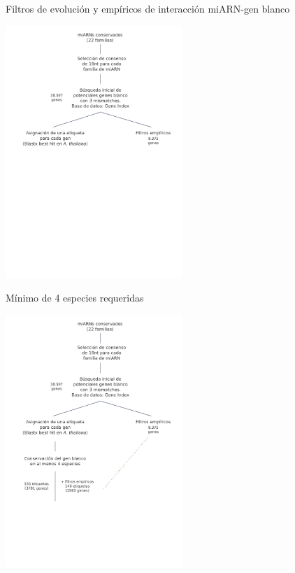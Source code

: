 \documentclass{beamer}
\begin{document}
\begin{frame}{Filtros de evolución y empíricos de interacción miARN-gen blanco}
	\begin{center}
		\includegraphics[width=0.5\textwidth]{img/NAR_fig1_04.png}
	\end{center}
\end{frame}

\begin{frame}{Mínimo de 4 especies requeridas}
	\begin{center}
		\includegraphics[width=0.5\textwidth]{img/NAR_fig1_05.png}
	\end{center}
\end{frame}
\end{document}
